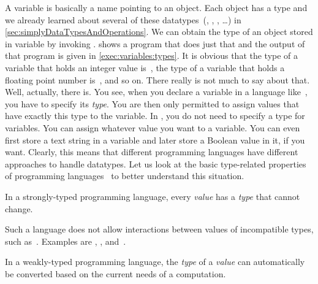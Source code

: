 %
\label{sec:variableTypesAndTypeHints}%
%
%
%
%
%
A variable is basically a name pointing to an object.
Each object has a type and we already learned about several of these datatypes~(, , , \dots) in \cref{sec:simplyDataTypesAndOperations}.
We can obtain the type of an object stored in variable  by invoking .
 shows a program  that does just that and the output of that program is given in \cref{exec:variables:types}.
It is obvious that the type of a variable that holds an integer value is~, the type of a variable that holds a floating point number is~, and so on.
There really is not much to say about that.%
\endhsection%
%
%
\label{sec:typesAndConfusion}%
\FloatBarrier%
%
%
%
%
Well, actually, there is.
You see, when you declare a variable in a language like~, you have to specify its \emph{type}.
You are then only permitted to assign values that have exactly this type to the variable.
In \python, you do not need to specify a type for variables.
You can assign whatever value you want to a variable.
You can even first store a text string in a variable and later store a Boolean value in it, if you want.
Clearly, this means that different programming languages have different approaches to handle datatypes.
Let us look at the basic type-related properties of programming languages~\cite{PSF:TPW:WIPADLAAASTL} to better understand this situation.%
%
\begin{definition}%
In a strongly-typed programming language, every \emph{value} has a \emph{type} that cannot change.%
\end{definition}%
%
Such a language does not allow interactions between values of incompatible types, such as~.
Examples are \python, , and~.%
%
\begin{definition}%
In a weakly-typed programming language, the \emph{type} of a \emph{value} can automatically be converted based on the current needs of a computation.%
\end{definition}%

